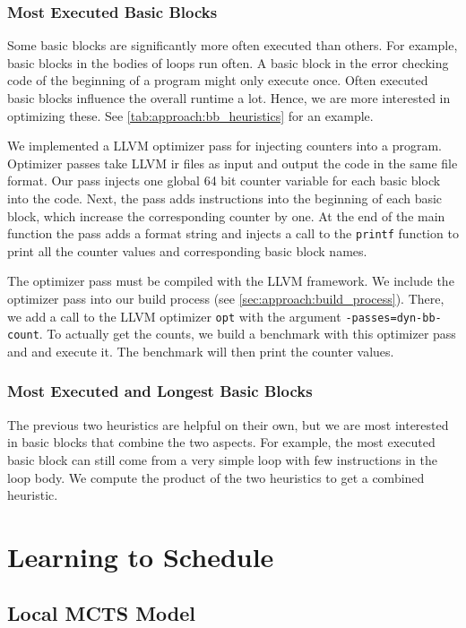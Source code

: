 \subsubsection{Most Executed Basic Blocks}
Some basic blocks are significantly more often executed than others.
For example, basic blocks in the bodies of loops run often.
A basic block in the error checking code of the beginning of a program might only execute once.
Often executed basic blocks influence the overall runtime a lot.
Hence, we are more interested in optimizing these.
See \cref{tab:approach:bb_heuristics} for an example.

We implemented a LLVM optimizer pass for injecting counters into a program.
Optimizer passes take LLVM \ac{ir} files as input and output the code in the same file format.
Our pass injects one global 64 bit counter variable for each basic block into the code.
Next, the pass adds instructions into the beginning of each basic block, which increase the corresponding counter by one.
At the end of the main function the pass adds a format string and injects a call to the \lstinline{printf} function to print all the counter values and corresponding basic block names.

The optimizer pass must be compiled with the LLVM framework.
We include the optimizer pass into our build process (see \cref{sec:approach:build_process}).
There, we add a call to the LLVM optimizer \lstinline{opt} with the argument \mbox{\lstinline{-passes=dyn-bb-count}}.
To actually get the counts, we build a benchmark with this optimizer pass and and execute it.
The benchmark will then print the counter values.

\subsubsection{Most Executed and Longest Basic Blocks}
The previous two heuristics are helpful on their own, but we are most interested in basic blocks that combine the two aspects.
For example, the most executed basic block can still come from a very simple loop with few instructions in the loop body.
We compute the product of the two heuristics to get a combined heuristic.

\section{Learning to Schedule}
\label{sec:approach:ml}
\subsection{Local MCTS Model}
\label{subsec:approach:ml:mcts}
